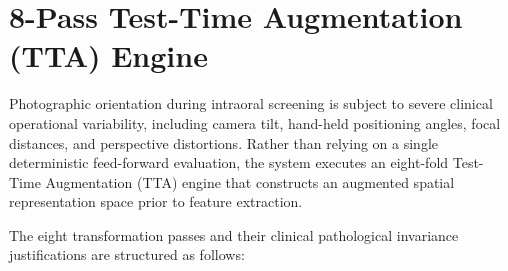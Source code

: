 \documentclass[12pt,a4paper,oneside]{report}
\begin{document}
\section{8-Pass Test-Time Augmentation (TTA) Engine}
\label{sec:tta_impl}

Photographic orientation during intraoral screening is subject to severe clinical operational variability, including camera tilt, hand-held positioning angles, focal distances, and perspective distortions. Rather than relying on a single deterministic feed-forward evaluation, the system executes an eight-fold Test-Time Augmentation (TTA) engine that constructs an augmented spatial representation space prior to feature extraction.

The eight transformation passes and their clinical pathological invariance justifications are structured as follows:
\end{document}

